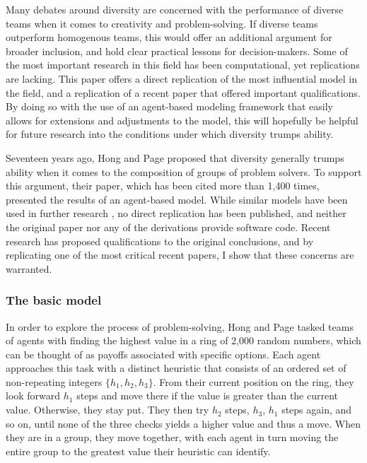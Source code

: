 Many debates around diversity are concerned with the performance of diverse teams when it comes to creativity and problem-solving. If diverse teams outperform homogenous teams, this would offer an additional argument for broader inclusion, and hold clear practical lessons for decision-makers. Some of the most important research in this field has been computational, yet replications are lacking. This paper offers a direct replication of the most influential model in the field\supercite{hong_groups_2004}, and a replication of a recent paper that offered important qualifications\supercite{grim_diversity_2019}. By doing so with the use of an agent-based modeling framework that easily allows for extensions and adjustments to the model, this will hopefully be helpful for future research into the conditions under which diversity trumps ability.

Seventeen years ago, Hong and Page\supercite{hong_groups_2004} proposed that diversity generally trumps ability when it comes to the composition of groups of problem solvers. To support this argument, their paper, which has been cited more than 1,400 times, presented the results of an agent-based model. While similar models have been used in further research \supercite{singer2019diversity, grim_diversity_2019, holman2018diversity}, no direct replication has been published, and neither the original paper nor any of the derivations provide software code. Recent research has proposed qualifications to the original conclusions, and by replicating one of the most critical recent papers\supercite{grim_diversity_2019}, I show that these concerns are warranted.  

\subsubsection{The basic model}

In order to explore the process of problem-solving, Hong and Page tasked teams of agents with finding the highest value in a ring of 2,000 random numbers, which can be thought of as payoffs associated with specific options. Each agent approaches this task with a distinct heuristic that consists of an ordered set of non-repeating integers $\{h_{1}, h_{2}, h_{3}\}$. From their current position on the ring, they look forward $h_{1}$ steps and move there if the value is greater than the current value. Otherwise, they stay put. They then try $h_{2}$ steps, $h_{3}$, $h_{1}$ steps again, and so on, until none of the three checks yields a higher value and thus a move. When they are in a group, they move together, with each agent in turn moving the entire group to the greatest value their heuristic can identify. 

